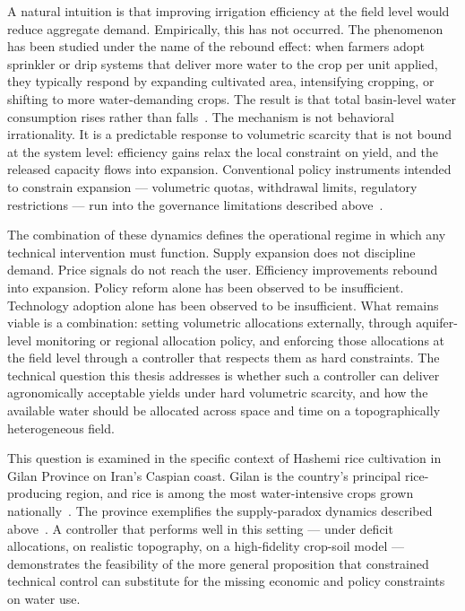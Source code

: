 A natural intuition is that improving irrigation efficiency at the
field level would reduce aggregate demand. Empirically, this has not
occurred. The phenomenon has been studied under the name of the
rebound effect: when farmers adopt sprinkler or drip systems that
deliver more water to the crop per unit applied, they typically
respond by expanding cultivated area, intensifying cropping, or
shifting to more water-demanding crops. The result is that total
basin-level water consumption rises rather than
falls~\cite{PerezBlanco2020,Hesabi2023}. The mechanism is not
behavioral irrationality. It is a predictable response to volumetric
scarcity that is not bound at the system level: efficiency gains
relax the local constraint on yield, and the released capacity flows
into expansion. Conventional policy instruments intended to constrain
expansion --- volumetric quotas, withdrawal limits, regulatory
restrictions --- run into the governance limitations described
above~\cite{PerezBlanco2020,Hajirad2025}.

The combination of these dynamics defines the operational regime in
which any technical intervention must function. Supply expansion does
not discipline demand. Price signals do not reach the user.
Efficiency improvements rebound into expansion. Policy reform alone
has been observed to be insufficient. Technology adoption alone has
been observed to be insufficient. What remains viable is a
combination: setting volumetric allocations externally, through
aquifer-level monitoring or regional allocation policy, and enforcing
those allocations at the field level through a controller that
respects them as hard constraints. The technical question this thesis
addresses is whether such a controller can deliver agronomically
acceptable yields under hard volumetric scarcity, and how the
available water should be allocated across space and time on a
topographically heterogeneous field.

This question is examined in the specific context of Hashemi rice
cultivation in Gilan Province on Iran's Caspian coast. Gilan is the
country's principal rice-producing region, and rice is among the most
water-intensive crops grown
nationally~\cite{jalali2021,sadidi2021,surfiran2025}. The province
exemplifies the supply-paradox dynamics described
above~\cite{Mesgaran2018,PourgholamAmiji2024}. A controller that
performs well in this setting --- under deficit allocations, on
realistic topography, on a high-fidelity crop-soil model ---
demonstrates the feasibility of the more general proposition that
constrained technical control can substitute for the missing economic
and policy constraints on water use.

